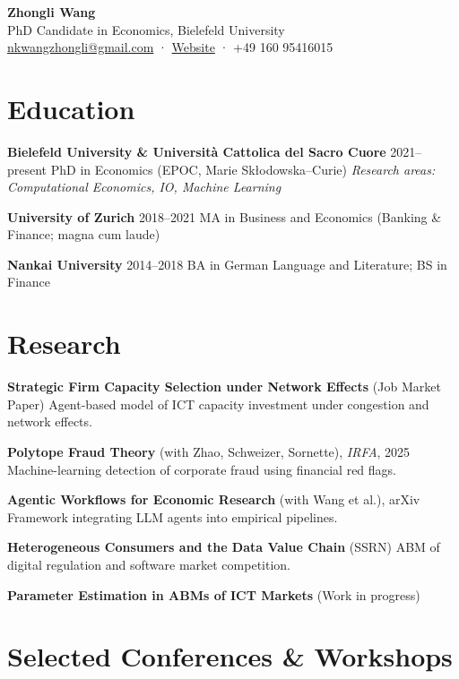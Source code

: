 \documentclass[a4paper,11pt]{article}
\begin{document}
\begin{center}
{\LARGE \textbf{Zhongli Wang}}\\[4pt]
PhD Candidate in Economics, Bielefeld University\\
\href{mailto:nkwangzhongli@gmail.com}{nkwangzhongli@gmail.com} · 
\href{https://sites.google.com/view/zhongli-wang}{Website} · 
+49 160 95416015
\end{center}

\section{Education}

\textbf{Bielefeld University \& Università Cattolica del Sacro Cuore} \hfill 2021–present  
PhD in Economics (EPOC, Marie Skłodowska–Curie)  
\emph{Research areas: Computational Economics, IO, Machine Learning}  

\textbf{University of Zurich} \hfill 2018–2021  
MA in Business and Economics (Banking \& Finance; magna cum laude)  

\textbf{Nankai University} \hfill 2014–2018  
BA in German Language and Literature; BS in Finance  

\section{Research}

\textbf{Strategic Firm Capacity Selection under Network Effects} (Job Market Paper)  
Agent-based model of ICT capacity investment under congestion and network effects.

\textbf{Polytope Fraud Theory} (with Zhao, Schweizer, Sornette), \emph{IRFA}, 2025  
Machine-learning detection of corporate fraud using financial red flags.

\textbf{Agentic Workflows for Economic Research} (with Wang et al.), arXiv  
Framework integrating LLM agents into empirical pipelines.

\textbf{Heterogeneous Consumers and the Data Value Chain} (SSRN)  
ABM of digital regulation and software market competition.

\textbf{Parameter Estimation in ABMs of ICT Markets} (Work in progress)  

\section{Selected Conferences \& Workshops}
\end{document}
